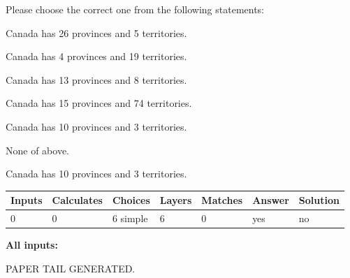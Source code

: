 \documentclass[12pt]{article}
\begin{document}
  
Please choose the correct one from the following statements:
 
 
Canada has  26 provinces and  5 territories.
 
 
Canada has   4 provinces and  19 territories.
 
 
Canada has  13 provinces and  8 territories.
 
 
Canada has  15 provinces and  74 territories.
 
 
Canada has 10  provinces and 3 territories.
 
 
 None of above.
 
 
\noindent{}
 
 
Canada has 10  provinces and 3 territories.
 
 
\noindent{}
 
 
   
   
   
   
\noindent\begin{tabular}{|l|l|l|l|l|l|l|}
 \hline
Inputs & Calculates & Choices & Layers & Matches & Answer & Solution \\ \hline
 0  & 
 0  & 
 6
  simple  
  & 
 6  & 
 0  & 
  yes & 
  no 
  \\ \hline
 \end{tabular}
   
   
   
   
\noindent{}
   
   
   
   
\noindent\vspace{0.1in}\hspace{-0.08in} {\textbf{\Large{All inputs: }}}
   
   
   
   
   
   
 \vspace{0.2in}
 
   
   
\vspace{2.0in} PAPER TAIL GENERATED.
   
   
   
\end{document}
